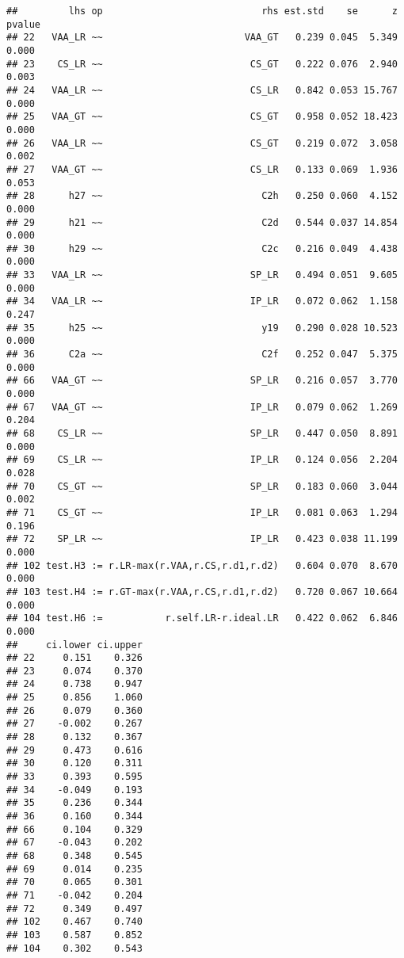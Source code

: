 \documentclass[
]{article}
\begin{document}
\begin{verbatim}
##         lhs op                            rhs est.std    se      z pvalue
## 22   VAA_LR ~~                         VAA_GT   0.239 0.045  5.349  0.000
## 23    CS_LR ~~                          CS_GT   0.222 0.076  2.940  0.003
## 24   VAA_LR ~~                          CS_LR   0.842 0.053 15.767  0.000
## 25   VAA_GT ~~                          CS_GT   0.958 0.052 18.423  0.000
## 26   VAA_LR ~~                          CS_GT   0.219 0.072  3.058  0.002
## 27   VAA_GT ~~                          CS_LR   0.133 0.069  1.936  0.053
## 28      h27 ~~                            C2h   0.250 0.060  4.152  0.000
## 29      h21 ~~                            C2d   0.544 0.037 14.854  0.000
## 30      h29 ~~                            C2c   0.216 0.049  4.438  0.000
## 33   VAA_LR ~~                          SP_LR   0.494 0.051  9.605  0.000
## 34   VAA_LR ~~                          IP_LR   0.072 0.062  1.158  0.247
## 35      h25 ~~                            y19   0.290 0.028 10.523  0.000
## 36      C2a ~~                            C2f   0.252 0.047  5.375  0.000
## 66   VAA_GT ~~                          SP_LR   0.216 0.057  3.770  0.000
## 67   VAA_GT ~~                          IP_LR   0.079 0.062  1.269  0.204
## 68    CS_LR ~~                          SP_LR   0.447 0.050  8.891  0.000
## 69    CS_LR ~~                          IP_LR   0.124 0.056  2.204  0.028
## 70    CS_GT ~~                          SP_LR   0.183 0.060  3.044  0.002
## 71    CS_GT ~~                          IP_LR   0.081 0.063  1.294  0.196
## 72    SP_LR ~~                          IP_LR   0.423 0.038 11.199  0.000
## 102 test.H3 := r.LR-max(r.VAA,r.CS,r.d1,r.d2)   0.604 0.070  8.670  0.000
## 103 test.H4 := r.GT-max(r.VAA,r.CS,r.d1,r.d2)   0.720 0.067 10.664  0.000
## 104 test.H6 :=           r.self.LR-r.ideal.LR   0.422 0.062  6.846  0.000
##     ci.lower ci.upper
## 22     0.151    0.326
## 23     0.074    0.370
## 24     0.738    0.947
## 25     0.856    1.060
## 26     0.079    0.360
## 27    -0.002    0.267
## 28     0.132    0.367
## 29     0.473    0.616
## 30     0.120    0.311
## 33     0.393    0.595
## 34    -0.049    0.193
## 35     0.236    0.344
## 36     0.160    0.344
## 66     0.104    0.329
## 67    -0.043    0.202
## 68     0.348    0.545
## 69     0.014    0.235
## 70     0.065    0.301
## 71    -0.042    0.204
## 72     0.349    0.497
## 102    0.467    0.740
## 103    0.587    0.852
## 104    0.302    0.543
\end{verbatim}
\end{document}
